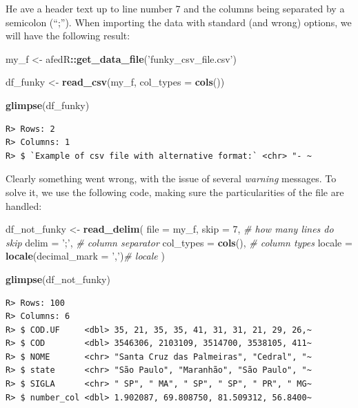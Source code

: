 \documentclass[
  12pt,
]{book}
\newenvironment{Shaded}{\begin{snugshade}}{\end{snugshade}}
\newcommand{\CommentTok}[1]{\textcolor[rgb]{0.37,0.37,0.37}{\textit{#1}}}
\newcommand{\DataTypeTok}[1]{\textcolor[rgb]{0.27,0.27,0.27}{#1}}
\newcommand{\DecValTok}[1]{\textcolor[rgb]{0.06,0.06,0.06}{#1}}
\newcommand{\KeywordTok}[1]{\textcolor[rgb]{0.27,0.27,0.27}{\textbf{#1}}}
\newcommand{\NormalTok}[1]{#1}
\newcommand{\OperatorTok}[1]{\textcolor[rgb]{0.43,0.43,0.43}{\textbf{#1}}}
\newcommand{\StringTok}[1]{\textcolor[rgb]{0.5,0.5,0.5}{#1}}
\begin{document}
He ave a header text up to line number 7 and the columns being separated by a semicolon (``;''). When importing the data with standard (and wrong) options, we will have the following result:

\begin{Shaded}
\begin{Highlighting}[]
\NormalTok{my_f <-}\StringTok{ }\NormalTok{afedR}\OperatorTok{::}\KeywordTok{get_data_file}\NormalTok{(}\StringTok{'funky_csv_file.csv'}\NormalTok{)}

\NormalTok{df_funky <-}\StringTok{ }\KeywordTok{read_csv}\NormalTok{(my_f, }
                     \DataTypeTok{col_types =} \KeywordTok{cols}\NormalTok{())}

\KeywordTok{glimpse}\NormalTok{(df_funky)}
\end{Highlighting}
\end{Shaded}

\begin{verbatim}
R> Rows: 2
R> Columns: 1
R> $ `Example of csv file with alternative format:` <chr> "- ~
\end{verbatim}

Clearly something went wrong, with the issue of several \emph{warning} messages. To solve it, we use the following code, making sure the particularities of the file are handled:

\begin{Shaded}
\begin{Highlighting}[]
\NormalTok{df_not_funky <-}\StringTok{ }\KeywordTok{read_delim}\NormalTok{(}
        \DataTypeTok{file =}\NormalTok{ my_f, }
        \DataTypeTok{skip =} \DecValTok{7}\NormalTok{, }\CommentTok{# how many lines do skip}
        \DataTypeTok{delim =} \StringTok{';'}\NormalTok{, }\CommentTok{# column separator}
        \DataTypeTok{col_types =} \KeywordTok{cols}\NormalTok{(), }\CommentTok{# column types}
        \DataTypeTok{locale =} \KeywordTok{locale}\NormalTok{(}\DataTypeTok{decimal_mark =} \StringTok{','}\NormalTok{)}\CommentTok{# locale}
\NormalTok{)}

\KeywordTok{glimpse}\NormalTok{(df_not_funky)}
\end{Highlighting}
\end{Shaded}

\begin{verbatim}
R> Rows: 100
R> Columns: 6
R> $ COD.UF     <dbl> 35, 21, 35, 35, 41, 31, 31, 21, 29, 26,~
R> $ COD        <dbl> 3546306, 2103109, 3514700, 3538105, 411~
R> $ NOME       <chr> "Santa Cruz das Palmeiras", "Cedral", "~
R> $ state      <chr> "São Paulo", "Maranhão", "São Paulo", "~
R> $ SIGLA      <chr> " SP", " MA", " SP", " SP", " PR", " MG~
R> $ number_col <dbl> 1.902087, 69.808750, 81.509312, 56.8400~
\end{verbatim}
\end{document}
